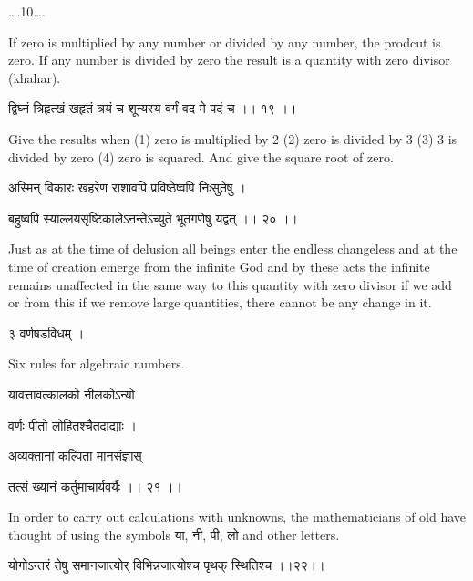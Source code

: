 \documentclass[]{article}
\date{}
\begin{document}
{\ldots{}.10\ldots{}.}

{If zero is multiplied by any number or divided by any number, the
prodcut is zero. If any number is divided by zero the result is a
quantity with zero divisor (khahar).}

{द्विघ्नं त्रिहृत्खं खहृतं त्रयं च शून्यस्य वर्गं वद मे पदं च ।। १९ ।। }

{Give the results when (1) zero is multiplied by 2 (2) zero is divided
by 3 (3) 3 is divided by zero (4) zero is squared. And give the square
root of zero.}

{अस्मिन् विकारः खहरेण राशावपि प्रविष्ठेष्वपि निःसुतेषु । }

{बहुष्वपि स्याल्लयसृष्टिकालेऽनन्तेऽच्युते भूतगणेषु यद्वत् ।। २० ।। }

{Just as at the time of delusion all beings enter the endless changeless
and at the time of creation emerge from the infinite God and by these
acts the infinite remains unaffected in the same way to this quantity
with zero divisor if we add or from this if we remove large quantities,
there cannot be any change in it.}

{३ वर्णषडविधम् । }

{Six rules for algebraic numbers.}

{यावत्तावत्कालको नीलकोऽन्यो }

{वर्णः पीतो लोहितश्चैतदाद्याः । }

{अव्यक्तानां कल्पिता मानसंज्ञास्}

{तत्सं ख्यानं कर्तुमाचार्यवर्यैः ।। २१ ।। }

{In order to carry out calculations with unknowns, the mathematicians of
old have thought of using the symbols या, नी, पी, लो and other letters.}

{योगोऽन्तरं तेषु समानजात्योर् विभिन्नजात्योश्च पृथक् स्थितिश्च
।।२२।।}{\\
}
\end{document}
